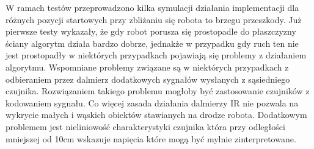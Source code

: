 W ramach testów przeprowadzono kilka symulacji działania implementacji dla
różnych pozycji startowych przy zbliżaniu się robota to brzegu przeszkody. Już
pierwsze testy wykazały, że gdy robot porusza się prostopadle do płaszczyzny
ściany algorytm działa bardzo dobrze, jednakże w przypadku gdy ruch ten nie jest
prostopadły w niektórych przypadkach pojawiają się problemy z działaniem
algorytmu. Wspomniane problemy związane są w niektórych przypadkach z
odbieraniem przez dalmierz dodatkowych sygnałów wysłanych z sąsiedniego czujnika.
Rozwiązaniem takiego problemu mogłoby być zastosowanie czujników z kodowaniem
sygnału. Co więcej zasada działania dalmierzy IR nie pozwala na wykrycie małych i
wąskich obiektów stawianych na drodze robota. Dodatkowym problemem jest
nieliniowość charakterystyki czujnika która przy odległości mniejszej od 10cm
wskazuje napięcia które mogą być mylnie zinterpretowane.
